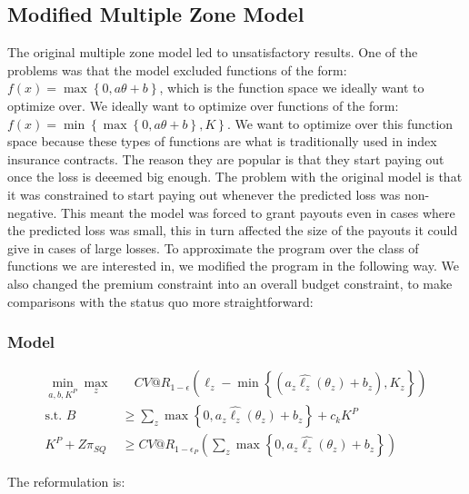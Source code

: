 \documentclass[11pt]{article}
\begin{document}
\subsection*{Modified Multiple Zone Model}
The original multiple zone model led to unsatisfactory results. One of the problems was that the model excluded functions of the form: $f(x) = \max \left \{0,a\theta + b\right \}$, which is the function space we ideally want to optimize over. We ideally want to optimize over functions of the form: $f(x) = \min \left \{\max \left \{0,a\theta + b \right \}, K \right \}$. We want to optimize over this function space because these types of functions are what is traditionally used in index insurance contracts. The reason they are popular is that they start paying out once the loss is deeemed big enough. The problem with the original model is that it was constrained to start paying out whenever the predicted loss was non-negative. This meant the model was forced to grant payouts even in cases where the predicted loss was small, this in turn affected the size of the payouts it could give in cases of large losses. To approximate the program over the class of functions we are interested in, we modified the program in the following way. We also changed the premium constraint into an overall budget constraint, to make comparisons with the status quo more straightforward: 

\subsubsection*{Model}
    
    \begin{align}
        \min_{a,b,K^P} \max_z &\quad CV@R_{1-\epsilon}(\ell_z - \min \left \{ (a_z\hat{\ell_z}(\theta_z) + b_z), K_z \right \})\\
        \text{s.t.   } B &\geq \sum_z \max \left \{ 0, a_z\hat{\ell_z}(\theta_z) + b_z \right \} + c_k K^P\\
        K^P + Z\pi_{SQ} &\geq CV@R_{1-\epsilon_P} \left( \sum_z \max \left \{ 0,a_z\hat{\ell_z}(\theta_z) + b_z \right \} \right )
    \end{align}
    
    The reformulation is: 
    
\end{document}
